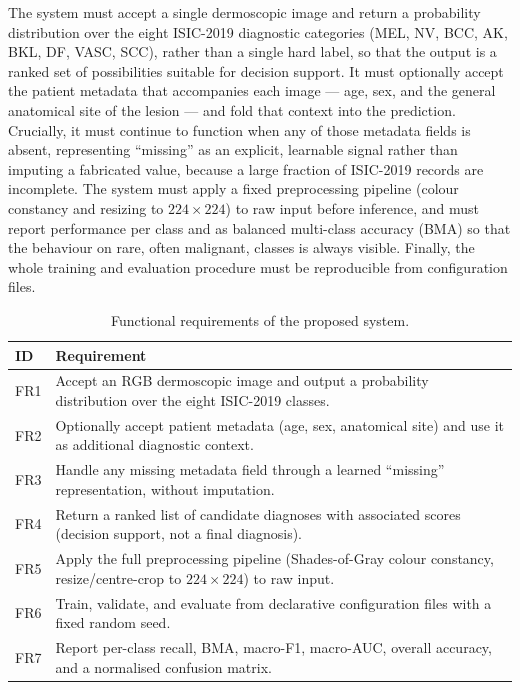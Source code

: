 The system must accept a single dermoscopic image and return a probability
distribution over the eight ISIC-2019 diagnostic categories (MEL, NV, BCC,
AK, BKL, DF, VASC, SCC), rather than a single hard label, so that the output
is a ranked set of possibilities suitable for decision support. It must
optionally accept the patient metadata that accompanies each image --- age,
sex, and the general anatomical site of the lesion --- and fold that context
into the prediction. Crucially, it must continue to function when any of
those metadata fields is absent, representing ``missing'' as an explicit,
learnable signal rather than imputing a fabricated value, because a large
fraction of ISIC-2019 records are incomplete. The system must apply a fixed
preprocessing pipeline (colour constancy and resizing to $224\times224$) to
raw input before inference, and must report performance per class and as
balanced multi-class accuracy (BMA) so that the behaviour on rare, often
malignant, classes is always visible. Finally, the whole training and
evaluation procedure must be reproducible from configuration files.

\begin{table}[h]
\centering
\caption{Functional requirements of the proposed system.}
\label{tab:functional-requirements}
\begin{tabular}{p{}p{}}
\toprule
ID & Requirement \\
\midrule
FR1 & Accept an RGB dermoscopic image and output a probability distribution over the eight ISIC-2019 classes. \\
FR2 & Optionally accept patient metadata (age, sex, anatomical site) and use it as additional diagnostic context. \\
FR3 & Handle any missing metadata field through a learned ``missing'' representation, without imputation. \\
FR4 & Return a ranked list of candidate diagnoses with associated scores (decision support, not a final diagnosis). \\
FR5 & Apply the full preprocessing pipeline (Shades-of-Gray colour constancy, resize/centre-crop to $224\times224$) to raw input. \\
FR6 & Train, validate, and evaluate from declarative configuration files with a fixed random seed. \\
FR7 & Report per-class recall, BMA, macro-F1, macro-AUC, overall accuracy, and a normalised confusion matrix. \\
\bottomrule
\end{tabular}
\end{table}


